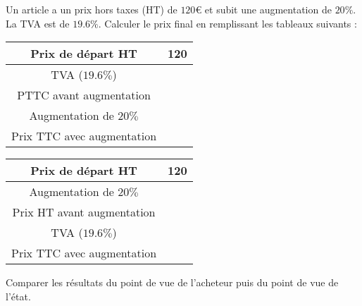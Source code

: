 
\begin{exercice}\label{exosmath-0038}

    Un article a un prix hors taxes (HT) de \( 120\)€ et subit une augmentation de \( 20\%\). La TVA est de \( 19.6\%\). Calculer le prix final en remplissant les tableaux suivants :
    \begin{multicols}{2}
        \begin{tabular}[]{|c||c|}
            \hline
            Prix de départ HT&120\\
            \hline\hline
            TVA (\( 19.6\%\))&\\
            \hline
            PTTC avant augmentation&\\
            \hline
            Augmentation de \( 20\%\)&\\
            \hline
            Prix TTC avec augmentation&\\
            \hline
        \end{tabular}

    \columnbreak

        \begin{tabular}[]{|c||c|}
            \hline
            Prix de départ HT&120\\
            \hline\hline
            Augmentation de \( 20\%\)&\\
            \hline
            Prix HT avant augmentation&\\
            \hline
            TVA (\( 19.6\%\))&\\
            \hline
            Prix TTC avec augmentation&\\
            \hline
        \end{tabular}
    \end{multicols}

    Comparer les résultats du point de vue de l'acheteur puis du point de vue de l'état.

\end{exercice}
